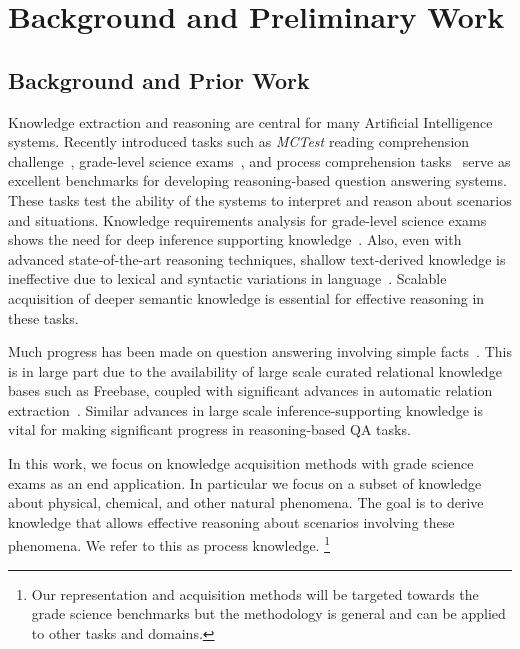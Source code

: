 \section{Background and Preliminary Work}

\subsection{Background and Prior Work}

Knowledge extraction and reasoning are central for many Artificial Intelligence systems. 
Recently introduced tasks such as {\em MCTest} reading comprehension challenge~\cite{richardson2013mctest}, grade-level science exams~\cite{clark2015elementary}, and process comprehension tasks~\cite{berantSrikumar14} serve as excellent benchmarks for developing reasoning-based question answering systems. 
These tasks test the ability of the systems to interpret and reason about scenarios and situations.
Knowledge requirements analysis for grade-level science exams shows the need for deep inference supporting knowledge~\cite{chb2013:akbc,clark2014:akbc}.
Also, even with advanced state-of-the-art reasoning techniques, shallow text-derived knowledge is ineffective due to lexical and syntactic variations in language~\cite{khot2015:emlnlp}. Scalable acquisition of deeper semantic knowledge is essential for effective reasoning in these tasks. 

Much progress has been made on question answering involving simple facts~\cite{berant2013semantic,fader2014open,bordes2014open,reddy2014large}. 
This is in large part due to the availability of large scale curated relational knowledge bases such as Freebase, coupled with significant advances in automatic relation extraction~\cite{schmitz2012open,carlson2010toward,suchanek2007yago}. Similar advances in large scale inference-supporting knowledge is vital for making significant progress in reasoning-based QA tasks.

In this work, we focus on knowledge acquisition methods with grade science exams as an end application. 
In particular we focus on a subset of knowledge about physical, chemical, and other natural phenomena.
The goal is to derive knowledge that allows effective reasoning about scenarios involving these phenomena. We refer to this as process knowledge. 
\footnote{Our representation and acquisition methods will be targeted towards the grade science benchmarks but the methodology is general and can be applied to other tasks and domains.}



